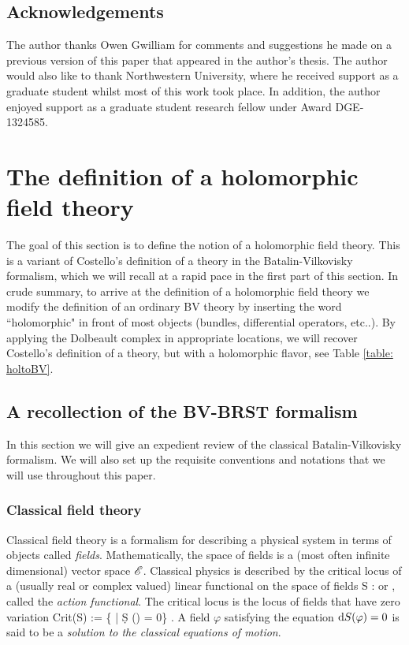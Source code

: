 \documentclass[11pt]{amsart}
\begin{document}
\subsection{Acknowledgements}

The author thanks Owen Gwilliam for comments and suggestions he made on a previous version of this paper that appeared in the author's thesis. 
The author would also like to thank Northwestern University, where he received support as a graduate student whilst most of this work took place. 
In addition, the author enjoyed support as a graduate student research fellow under Award DGE-1324585. 
 
\section{The definition of a holomorphic field theory}

The goal of this section is to define the notion of a holomorphic field theory. 
This is a variant of Costello's definition of a theory in the Batalin-Vilkovisky formalism, which we will recall at a rapid pace in the first part of this section.
In crude summary, to arrive at the definition of a holomorphic field theory we modify the definition of an ordinary BV theory by inserting the word ``holomorphic" in front of most objects (bundles, differential operators, etc..).
By applying the Dolbeault complex in appropriate locations, we will recover Costello's definition of a theory, but with a holomorphic flavor, see Table \ref{table: holtoBV}. 

\subsection{A recollection of the BV-BRST formalism}

In this section we will give an expedient review of the classical Batalin-Vilkovisky formalism.
We will also set up the requisite conventions and notations that we will use throughout this paper. 

\subsubsection{Classical field theory} \label{sec: classical bv}

Classical field theory is a formalism for describing a physical system in terms of objects called {\em fields}. 
Mathematically, the space of fields is a (most often infinite dimensional) vector space $\mathscr E$. 
Classical physics is described by the critical locus of a (usually real or complex valued) linear functional on the space of fields 
\be\label{actionfnl}
S : \sE \to \RR \;\; {\rm or} \;\; \CC,
\ee
called the {\em action functional}. 
The critical locus is the locus of fields that have zero variation
\be
{\rm Crit}(S) := \{\varphi \in \sE \; | \; \d S (\varphi) = 0\} .
\ee
A field $\varphi$ satisfying the equation ${\rm d} S (\varphi) = 0$ is said to be a {\em solution to the classical equations of motion}. 
\end{document}
